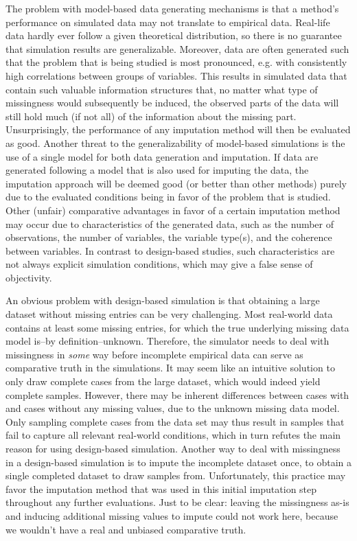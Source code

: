 \documentclass[bimj,fleqn]{w-art}
\begin{document}
The problem with model-based data generating mechanisms is that a method's performance on simulated data may not translate to empirical data. Real-life data hardly ever follow a given theoretical distribution, so there is no guarantee that simulation results are generalizable. Moreover, data are often generated such that the problem that is being studied is most pronounced, e.g. with consistently high correlations between groups of variables. This results in simulated data that contain such valuable information structures that, no matter what type of missingness would subsequently be induced, the observed parts of the data will still hold much (if not all) of the information about the missing part. Unsurprisingly, the performance of any imputation method will then be evaluated as good. Another threat to the generalizability of model-based simulations is the use of a single model for both data generation and imputation. If data are generated following a model that is also used for imputing the data, the imputation approach will be deemed good (or better than other methods) purely due to the evaluated conditions being in favor of the problem that is studied. Other (unfair) comparative advantages in favor of a certain imputation method may occur due to characteristics of the generated data, such as the number of observations, the number of variables, the variable type(s), and the coherence between variables. In contrast to design-based studies, such characteristics are not always explicit simulation conditions, which may give a false sense of objectivity.

An obvious problem with design-based simulation is that obtaining a large dataset without missing entries can be very challenging. Most real-world data contains at least some missing entries, for which the true underlying missing data model is--by definition--unknown. Therefore, the simulator needs to deal with missingness in \textit{some} way before incomplete empirical data can serve as comparative truth in the simulations. It may seem like an intuitive solution to only draw complete cases from the large dataset, which would indeed yield complete samples. However, there may be inherent differences between cases with and cases without any missing values, due to the unknown missing data model. Only sampling complete cases from the data set may thus result in samples that fail to capture all relevant real-world conditions, which in turn refutes the main reason for using design-based simulation. Another way to deal with missingness in a design-based simulation is to impute the incomplete dataset once, to obtain a single completed dataset to draw samples from. Unfortunately, this practice may favor the imputation method that was used in this initial imputation step throughout any further evaluations. Just to be clear: leaving the missingness as-is and inducing additional missing values to impute could not work here, because we wouldn't have a real and unbiased comparative truth.
\end{document}
